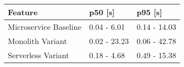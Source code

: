 \begin{tabular}{lll}
\toprule
Feature & p50 [s] & p95 [s] \\
\midrule
Microservice Baseline & 0.04 - 6.01 & 0.14 - 14.03 \\
Monolith Variant & 0.02 - 23.23 & 0.06 - 42.78 \\
Serverless Variant & 0.18 - 4.68 & 0.49 - 15.38 \\
\bottomrule
\end{tabular}
